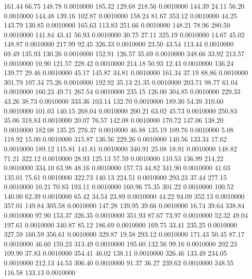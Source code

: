  161.44   66.75  148.78   0.0010000
 185.32  129.68  218.56   0.0010000
 144.39   24.11   56.20   0.0010000
 144.48  139.16  102.87   0.0010000
 158.24   81.67  353.12   0.0010000
  44.25  143.79  130.85   0.0010000
 165.63  113.83  251.66   0.0010000
 148.21   78.96  280.50   0.0010000
 141.84   43.41   56.93   0.0010000
  30.75   27.11  325.19   0.0010000
  14.67   45.02  148.87   0.0010000
 217.99   92.45  326.33   0.0010000
  23.50   43.54  113.44   0.0010000
  69.49  135.93  130.26   0.0010000
 152.91  126.57   35.69   0.0010000
 348.66   33.92  213.57   0.0010000
  10.90  121.57  228.42   0.0010000
 214.18   50.93   12.43   0.0010000
 136.24  139.77   29.46   0.0010000
  45.17  145.87   34.81   0.0010000
 161.34   37.19   88.86   0.0010000
 301.79  107.34   75.26   0.0010000
 192.92   35.13   21.35   0.0010000
 203.71   98.77   61.04   0.0010000
 160.23   49.71  267.54   0.0010000
 235.15  126.00  304.85   0.0010000
 229.33   43.26   38.73   0.0010000
 333.36  103.14  132.70   0.0010000
 189.30   54.39  310.60   0.0010000
 101.03  140.15  268.04   0.0010000
 200.21   63.02   45.73   0.0010000
 250.83   35.06  318.83   0.0010000
  20.07   76.57  142.08   0.0010000
 170.72  147.06  138.20   0.0010000
 182.08  135.25  276.37   0.0010000
  46.88  135.19  109.76   0.0010000
   5.08  118.92   15.00   0.0010000
 315.87  136.56  229.26   0.0010000
 140.56  133.34   17.62   0.0010000
 189.12  115.81  141.81   0.0010000
 340.91   25.08   18.91   0.0010000
 148.82   71.21  322.12   0.0010000
  28.93  125.13   57.59   0.0010000
 110.53  136.99  214.22   0.0010000
 334.10   63.98   48.16   0.0010000
 157.73   44.82  341.90   0.0010000
  41.03  135.01   75.61   0.0010000
 322.73  140.13  224.51   0.0010000
 293.23   37.44  277.15   0.0010000
  10.21   70.83  193.11   0.0010000
 160.96   75.35  301.22   0.0010000
 100.52  140.00   62.39   0.0010000
  65.42   34.54   23.89   0.0010000
  44.22   94.09  352.13   0.0010000
 357.01  149.84  305.58   0.0010000
 147.28  139.95   39.66   0.0010000
  16.74   39.64  338.84   0.0010000
  97.90  153.37  326.35   0.0010000
 351.93   87.67   73.97   0.0010000
  52.32   49.04  197.61   0.0010000
 340.87   85.12  186.69   0.0010000
 169.75   33.41  235.25   0.0010000
 327.59  160.59  356.61   0.0010000
 329.87   19.58  293.12   0.0010000
 171.43   50.45   87.17   0.0010000
  46.60  159.23  313.49   0.0010000
 195.60  132.56   99.16   0.0010000
 202.23  109.90   37.83   0.0010000
 354.41   46.02  138.11   0.0010000
 326.46  133.49  234.05   0.0010000
 212.13   44.53  306.40   0.0010000
  91.37   36.27  239.62   0.0010000
 348.55  116.58  133.13   0.0010000
